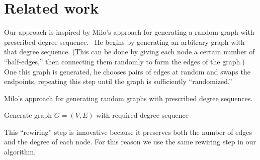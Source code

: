 \section{Related work}
\label{sec:related}

Our approach is inspired by Milo's approach for generating a random graph with prescribed degree sequence.~\cite{milo04random} He begins by generating an arbitrary graph with that degree sequence.  (This can be done by giving each node a certain number of ``half-edges,'' then connecting them randomly to form the edges of the graph.)  One this graph is generated, he chooses pairs of edges at random and swaps the endpoints, repeating this step until the graph is sufficiently ``randomized.''

\begin{algorithm}
\caption{Milo's approach for generating random graphs with prescribed degree sequences.}
\label{algorithm:milo}
\begin{algorithmic}
Generate graph $G = (V, E)$ with required degree sequence\\
\end{algorithmic}
\end{algorithm}

This ``rewiring'' step is innovative because it preserves both the number of edges and the degree of each node.  For this reason we use the same rewiring step in our algorithm.